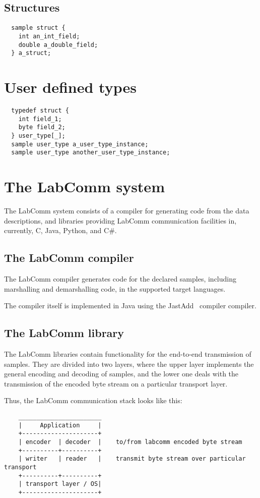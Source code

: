 \documentclass[a4paper]{article}
\begin{document}
\subsection{Structures}

\begin{verbatim}
  sample struct {
    int an_int_field;
    double a_double_field;
  } a_struct;
\end{verbatim}

\section{User defined types}

\begin{verbatim}
  typedef struct {
    int field_1;
    byte field_2;
  } user_type[_];
  sample user_type a_user_type_instance;
  sample user_type another_user_type_instance;
\end{verbatim}

\section{The LabComm system}

The LabComm system consists of a compiler for generating code from the data
descriptions, and libraries providing LabComm communication facilities in,
currently, C, Java, Python, and C\#.


\subsection{The LabComm compiler}

The LabComm compiler generates code for the declared samples, including marshalling and
demarshalling code, in the supported target languages.

The compiler itself is implemented in Java using the JastAdd~\cite{jastadd} compiler compiler.
\subsection{The LabComm library}

The LabComm libraries contain functionality for the end-to-end transmission
of samples. They are divided into two layers, where the upper layer implements
the general encoding and decoding of samples, and the lower one deals with 
the transmission of the encoded byte stream on a particular transport layer.

Thus, the LabComm communication stack looks like this:
\begin{verbatim}
    _______________________
    |     Application     |
    +---------------------+
    | encoder  | decoder  |    to/from labcomm encoded byte stream
    +----------+----------+
    | writer   | reader   |    transmit byte stream over particular transport
    +----------+----------+
    | transport layer / OS|
    +---------------------+
\end{verbatim}
\end{document}
